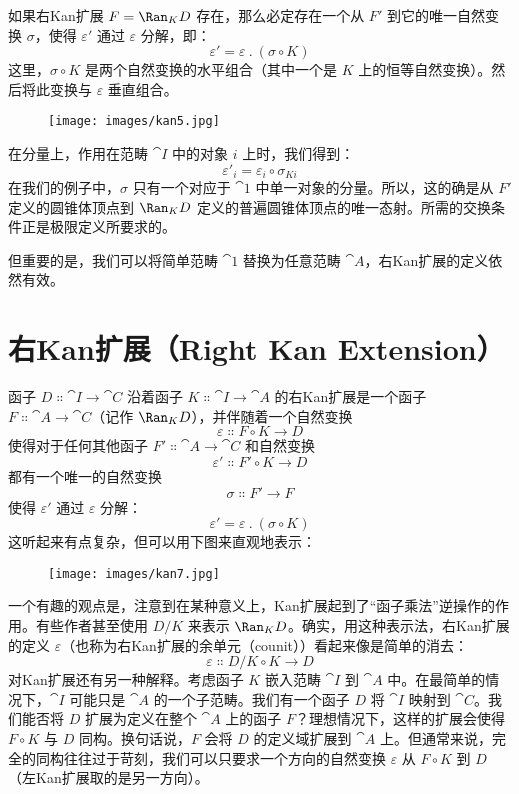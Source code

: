 \noindent
如果右Kan扩展 $F = \Ran_{K}D$ 存在，那么必定存在一个从 $F'$ 到它的唯一自然变换 $\sigma$，使得 $\varepsilon'$ 通过 $\varepsilon$ 分解，即：
\[\varepsilon' = \varepsilon\ .\ (\sigma \circ K)\]
这里，$\sigma \circ K$ 是两个自然变换的水平组合（其中一个是 $K$ 上的恒等自然变换）。然后将此变换与 $\varepsilon$ 垂直组合。

\begin{figure}[H]
  \centering
  \texttt{[image: images/kan5.jpg]}
\end{figure}

\noindent
在分量上，作用在范畴 $\cat{I}$ 中的对象 $i$ 上时，我们得到：
\[\varepsilon'_i = \varepsilon_i \circ \sigma_{K i}\]
在我们的例子中，$\sigma$ 只有一个对应于 $\cat{1}$ 中单一对象的分量。所以，这的确是从 $F'$ 定义的圆锥体顶点到 $\Ran_{K}D$ 定义的普遍圆锥体顶点的唯一态射。所需的交换条件正是极限定义所要求的。

但重要的是，我们可以将简单范畴 $\cat{1}$ 替换为任意范畴 $\cat{A}$，右Kan扩展的定义依然有效。

\section{右Kan扩展（Right Kan Extension）}

函子 $D \Colon \cat{I} \to \cat{C}$ 沿着函子 $K \Colon \cat{I} \to \cat{A}$ 的右Kan扩展是一个函子 $F \Colon \cat{A} \to \cat{C}$（记作 $\Ran_{K}D$），并伴随着一个自然变换
\[\varepsilon \Colon F \circ K \to D\]
使得对于任何其他函子 $F' \Colon \cat{A} \to \cat{C}$ 和自然变换
\[\varepsilon' \Colon F' \circ K \to D\]
都有一个唯一的自然变换
\[\sigma \Colon F' \to F\]
使得 $\varepsilon'$ 通过 $\varepsilon$ 分解：
\[\varepsilon' = \varepsilon\ .\ (\sigma \circ K)\]
这听起来有点复杂，但可以用下图来直观地表示：

\begin{figure}[H]
  \centering
  \texttt{[image: images/kan7.jpg]}
\end{figure}

\noindent
一个有趣的观点是，注意到在某种意义上，Kan扩展起到了“函子乘法”逆操作的作用。有些作者甚至使用 $D/K$ 来表示 $\Ran_{K}D$。确实，用这种表示法，右Kan扩展的定义 $\varepsilon$（也称为右Kan扩展的余单元（counit））看起来像是简单的消去：
\[\varepsilon \Colon D/K \circ K \to D\]
对Kan扩展还有另一种解释。考虑函子 $K$ 嵌入范畴 $\cat{I}$ 到 $\cat{A}$ 中。在最简单的情况下，$\cat{I}$ 可能只是 $\cat{A}$ 的一个子范畴。我们有一个函子 $D$ 将 $\cat{I}$ 映射到 $\cat{C}$。我们能否将 $D$ 扩展为定义在整个 $\cat{A}$ 上的函子 $F$？理想情况下，这样的扩展会使得 $F \circ K$ 与 $D$ 同构。换句话说，$F$ 会将 $D$ 的定义域扩展到 $\cat{A}$ 上。但通常来说，完全的同构往往过于苛刻，我们可以只要求一个方向的自然变换 $\varepsilon$ 从 $F \circ K$ 到 $D$（左Kan扩展取的是另一方向）。


